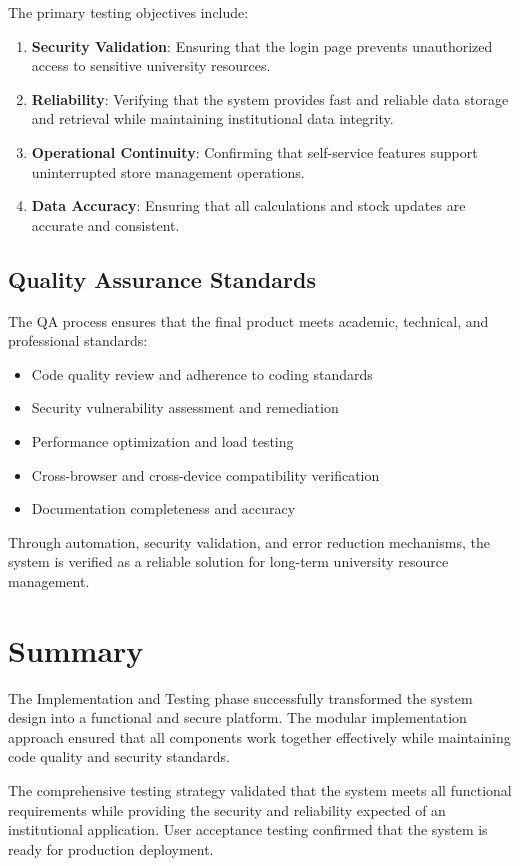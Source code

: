 The primary testing objectives include:

\begin{enumerate}
    \item \textbf{Security Validation}: Ensuring that the login page prevents unauthorized access to sensitive university resources.

    \item \textbf{Reliability}: Verifying that the system provides fast and reliable data storage and retrieval while maintaining institutional data integrity.

    \item \textbf{Operational Continuity}: Confirming that self-service features support uninterrupted store management operations.

    \item \textbf{Data Accuracy}: Ensuring that all calculations and stock updates are accurate and consistent.
\end{enumerate}

\subsection{Quality Assurance Standards}

The QA process ensures that the final product meets academic, technical, and professional standards:

\begin{itemize}
    \item Code quality review and adherence to coding standards
    \item Security vulnerability assessment and remediation
    \item Performance optimization and load testing
    \item Cross-browser and cross-device compatibility verification
    \item Documentation completeness and accuracy
\end{itemize}

Through automation, security validation, and error reduction mechanisms, the system is verified as a reliable solution for long-term university resource management.

\section{Summary}

The Implementation and Testing phase successfully transformed the system design into a functional and secure platform. The modular implementation approach ensured that all components work together effectively while maintaining code quality and security standards.

The comprehensive testing strategy validated that the system meets all functional requirements while providing the security and reliability expected of an institutional application. User acceptance testing confirmed that the system is ready for production deployment.